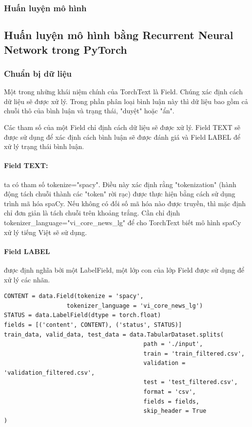 \documentclass[runningheads]{llncs}
\begin{document}
\subsubsection{Huấn luyện mô hình}

\subsection{Huấn luyện mô hình bằng Recurrent Neural Network trong PyTorch}

\subsubsection{Chuẩn bị dữ liệu}

Một trong những khái niệm chính của TorchText là Field. Chúng xác định cách dữ liệu sẽ được xử lý. Trong phần phân loại bình luận này thì dữ liệu bao gồm cả chuỗi thô của bình luận và trạng thái, "duyệt" hoặc "ẩn".

Các tham số của một Field chỉ định cách dữ liệu sẽ được xử lý. Field TEXT sẽ được sử dụng để xác định cách bình luận sẽ được đánh giá và Field LABEL để xử lý trạng thái bình luận.

\paragraph{Field TEXT:}ta có tham số tokenize="spacy". Điều này xác định rằng "tokenization" (hành động tách chuỗi thành các "token" rời rạc) được thực hiện bằng cách sử dụng trình mã hóa spaCy. Nếu không có đối số mã hóa nào được truyền, thì mặc định chỉ đơn giản là tách chuỗi trên khoảng trắng. Cần chỉ định tokenizer\_language="vi\_core\_news\_lg" để cho TorchText biết mô hình spaCy xử lý tiếng Việt sẽ sử dụng.

\paragraph{Field LABEL} được định nghĩa bởi một LabelField, một lớp con của lớp Field được sử dụng để xử lý các nhãn.

\begin{lstlisting}
CONTENT = data.Field(tokenize = 'spacy',
                  tokenizer_language = 'vi_core_news_lg')
STATUS = data.LabelField(dtype = torch.float)
fields = [('content', CONTENT), ('status', STATUS)]
train_data, valid_data, test_data = data.TabularDataset.splits(
                                        path = './input',
                                        train = 'train_filtered.csv',
                                        validation = 'validation_filtered.csv',
                                        test = 'test_filtered.csv',
                                        format = 'csv',
                                        fields = fields,
                                        skip_header = True
)
\end{lstlisting}
\end{document}
